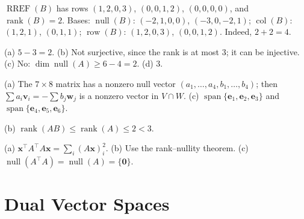 \documentclass[11pt]{article}
\DeclareMathOperator{\rank}{rank}
\DeclareMathOperator{\Null}{null}
\DeclareMathOperator{\col}{col}
\DeclareMathOperator{\row}{row}
\DeclareMathOperator{\Span}{span}
\DeclareMathOperator{\RREF}{RREF}
\begin{document}
\begin{description}[leftmargin=0pt, itemsep=0.3em]
    \item[\ref{pr:bases-B}.] $\RREF(B)$ has rows $(1, 2, 0, 3)$, $(0, 0, 1, 2)$, $(0, 0, 0, 0)$, and $\rank(B) = 2$. Bases: $\Null(B)$: $(-2, 1, 0, 0)$, $(-3, 0, -2, 1)$; $\col(B)$: $(1, 2, 1)$, $(0, 1, 1)$; $\row(B)$: $(1, 2, 0, 3)$, $(0, 0, 1, 2)$. Indeed, $2 + 2 = 4$.
    \item[\ref{pr:onto}.] (a) $5 - 3 = 2$. (b) Not surjective, since the rank is at most $3$; it can be injective. (c) No: $\dim \Null(A) \geq 6 - 4 = 2$. (d) $3$.
    \item[\ref{pr:intersect}.] (a) The $7 \times 8$ matrix has a nonzero null vector $(a_1, \ldots, a_4, b_1, \ldots, b_4)$; then $\sum a_i \mathbf{v}_i = -\sum b_j \mathbf{w}_j$ is a nonzero vector in $V \cap W$. (c) $\Span\{\mathbf{e}_1, \mathbf{e}_2, \mathbf{e}_3\}$ and $\Span\{\mathbf{e}_4, \mathbf{e}_5, \mathbf{e}_6\}$.
    \item[\ref{pr:rankAB}.] (b) $\rank(AB) \leq \rank(A) \leq 2 < 3$.
    \item[\ref{pr:ATA}.] (a) $\mathbf{x}^\top A^\top A \mathbf{x} = \sum_i (A\mathbf{x})_i^2$. (b) Use the rank--nullity theorem. (c) $\Null(A^\top A) = \Null(A) = \{\mathbf{0}\}$.
\end{description}

\section*{Dual Vector Spaces}
\end{document}
